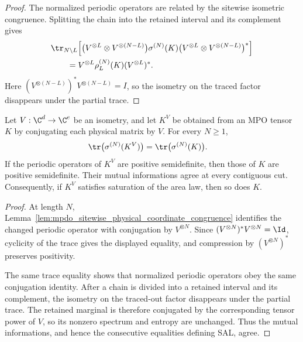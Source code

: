 \begin{proof}\leanok
    The normalized periodic operators are related by the sitewise isometric
    congruence.  Splitting the chain into the retained interval and its
    complement gives
    \begin{align}
         & \tr_{N\setminus L}\!\left[
            \bigl(V^{\otimes L}\otimes V^{\otimes(N-L)}\bigr)
            \sigma^{(N)}(K)
        \bigl(V^{\otimes L}\otimes V^{\otimes(N-L)}\bigr)^*\right] \\
         & \qquad=V^{\otimes L}\rho_L^{(N)}(K)(V^{\otimes L})^*.
        \notag
    \end{align}
    Here $(V^{\otimes(N-L)})^*V^{\otimes(N-L)}=I$, so the isometry on the
    traced factor disappears under the partial trace.
\end{proof}

\begin{lemma}
    \label{thm:mpdo_sal_physical_isometry_transport}
    \leanok
    Let $V:\C^d\to\C^e$ be an isometry, and let $K^V$ be obtained from an MPO
    tensor $K$ by conjugating each physical matrix by $V$. For every $N\geq1$,
    \begin{align}
        \tr\bigl(\sigma^{(N)}(K^V)\bigr)
         & =\tr\bigl(\sigma^{(N)}(K)\bigr).
        \notag
    \end{align}
    If the periodic operators of $K^V$ are positive semidefinite, then those
    of $K$ are positive semidefinite. Their mutual informations agree at
    every contiguous cut. Consequently, if $K^V$ satisfies saturation of the
    area law, then so does $K$.
\end{lemma}

\begin{proof}\leanok
    At length $N$, Lemma~\ref{lem:mpdo_sitewise_physical_coordinate_congruence}
    identifies the changed periodic operator with conjugation by
    $V^{\otimes N}$. Since $(V^{\otimes N})^*V^{\otimes N}=\Id$, cyclicity
    of the trace gives the displayed equality, and compression by
    $(V^{\otimes N})^*$ preserves positivity.

    The same trace equality shows that normalized periodic operators obey the
    same conjugation identity. After a chain is divided into a retained
    interval and its complement, the isometry on the traced-out factor
    disappears under the partial trace. The retained marginal is therefore
    conjugated by the corresponding tensor power of $V$, so its nonzero
    spectrum and entropy are unchanged. Thus the mutual informations, and
    hence the consecutive equalities defining SAL, agree.
\end{proof}

